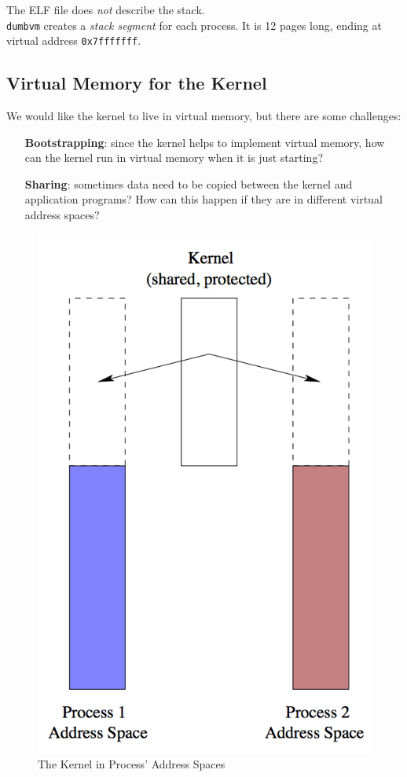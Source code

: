 \documentclass[12pt]{article}
\theoremstyle{plain}
\theoremstyle{definition}
\begin{document}
The ELF file does \emph{not} describe the stack. \\

\texttt{dumbvm} creates a \emph{stack segment} for each process.
It is 12 pages long, ending at virtual address \texttt{0x7fffffff}.


\subsection{Virtual Memory for the Kernel}
We would like the kernel to live in virtual memory, but there are some challenges:
\begin{itemize}
  \item[\textbf{Bootstrapping}:] since the kernel helps to implement virtual memory, how can the kernel run in virtual memory when it is just starting?
  \item[\textbf{Sharing}:] sometimes data need to be copied between the kernel and application programs?
  How can this happen if they are in different virtual address spaces?
\end{itemize}

\begin{figure}[H]
  \centering
  \includegraphics[scale=0.55]{pictures/kernel_v_mem.png}
  \caption{The Kernel in Process' Address Spaces}
  \label{fig:kernel_v_mem}
\end{figure}
\end{document}
